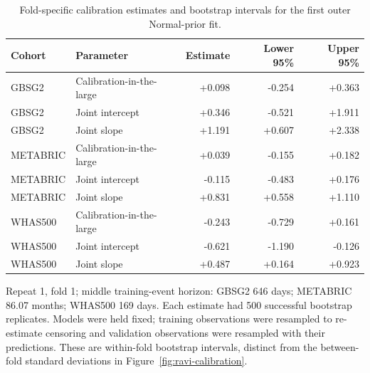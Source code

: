 \begin{table}[htbp]
\centering\small
\caption{Fold-specific calibration estimates and bootstrap intervals for the first outer Normal-prior fit.}
\label{tab:sup-calibration-bootstrap}
\begin{tabular}{@{}llrrr@{}}\toprule
Cohort & Parameter & Estimate & Lower 95\% & Upper 95\%\\\midrule
GBSG2 & Calibration-in-the-large & +0.098 & -0.254 & +0.363 \\
GBSG2 & Joint intercept & +0.346 & -0.521 & +1.911 \\
GBSG2 & Joint slope & +1.191 & +0.607 & +2.338 \\
METABRIC & Calibration-in-the-large & +0.039 & -0.155 & +0.182 \\
METABRIC & Joint intercept & -0.115 & -0.483 & +0.176 \\
METABRIC & Joint slope & +0.831 & +0.558 & +1.110 \\
WHAS500 & Calibration-in-the-large & -0.243 & -0.729 & +0.161 \\
WHAS500 & Joint intercept & -0.621 & -1.190 & -0.126 \\
WHAS500 & Joint slope & +0.487 & +0.164 & +0.923 \\
\bottomrule\end{tabular}
\par\smallskip\begin{minipage}{\linewidth}\footnotesize Repeat 1, fold 1; middle training-event horizon: GBSG2 646 days; METABRIC 86.07 months; WHAS500 169 days. Each estimate had 500 successful bootstrap replicates. Models were held fixed; training observations were resampled to re-estimate censoring and validation observations were resampled with their predictions. These are within-fold bootstrap intervals, distinct from the between-fold standard deviations in Figure~\ref{fig:ravi-calibration}.\end{minipage}
\end{table}

